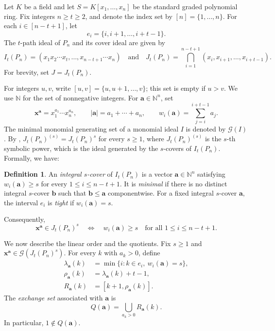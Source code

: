 \documentclass[12pt]{amsart}
\theoremstyle{definition}
\newtheorem{definition}[theorem]{Definition}
\theoremstyle{remark}
\numberwithin{equation}{section}
\begin{document}
Let $K$ be a field and let $S = K[x_1, \ldots, x_n]$ be the standard graded polynomial ring. Fix integers $n \ge t \ge 2$, and denote the index set by $[n] = \{1, \ldots, n\}$. For each $i \in [n-t+1]$, let
\[
e_i = \{i, i+1, \ldots, i+t-1\}.
\]
The $t$-path ideal of $P_n$ and its cover ideal are given by
$$I_t(P_n) = (x_1 x_2 \cdots x_t, \ldots, x_{n-t+1} \cdots x_n) \quad \text{and} \quad J_t(P_n) = \bigcap_{i=1}^{n-t+1} (x_i, x_{i+1}, \ldots, x_{i+t-1}).$$
For brevity, set $J=J_t(P_n)$.

For integers $u, v$, write $[u, v] = \{u, u+1, \ldots, v\}$; this set is empty if $u > v$. We use $\mathbb{N}$ for the set of nonnegative integers. For $\mathbf{a} \in \mathbb{N}^n$, set
\[
\mathbf{x}^{\mathbf{a}} = x_1^{a_1} \cdots x_n^{a_n}, 
\qquad |\mathbf{a}| = a_1 + \cdots + a_n, 
\qquad w_i(\mathbf{a}) = \sum_{j=i}^{i+t-1} a_j.
\]
The minimal monomial generating set of a monomial ideal $I$ is denoted by $\mathcal{G}(I)$. By \cite[Theorem 1.1]{HHT}, $J_t(P_n)^{(s)} = J_t(P_n)^s$ for every $s \ge 1$, where $J_t(P_n)^{(s)}$ is the $s$-th symbolic power, which is the ideal generated by the $s$-covers of $I_t(P_n)$. Formally, we have:

\begin{definition}
An \emph{integral $s$-cover} of $I_t(P_n)$ is a vector $\mathbf{a} \in \mathbb{N}^n$ satisfying $w_i(\mathbf{a}) \ge s$ for every $1 \le i \le n-t+1$. It is \emph{minimal} if there is no distinct integral $s$-cover $\mathbf{b}$ such that $\mathbf{b} \le \mathbf{a}$ componentwise. For a fixed integral $s$-cover $\mathbf{a}$, the interval $e_i$ is \emph{tight} if $w_i(\mathbf{a}) = s$.
\end{definition}

Consequently,
$$
\mathbf{x}^{\mathbf{a}} \in J_t(P_n)^s \quad \Longleftrightarrow \quad w_i(\mathbf{a}) \ge s \quad \text{for all } 1 \le i \le n-t+1.$$

We now describe the linear order and the quotients. 
Fix $s \ge 1$ and $\mathbf{x}^{\mathbf{a}} \in \mathcal{G}(J_t(P_n)^s)$.
For every $k$ with $a_k > 0$, define
\begin{align*}
\lambda_{\mathbf{a}}(k) &= \min\{i : k \in e_i, \ w_i(\mathbf{a}) = s\}, \\
\rho_{\mathbf{a}}(k) &= \lambda_{\mathbf{a}}(k) + t - 1, \\
R_{\mathbf{a}}(k) &= [k+1, \rho_{\mathbf{a}}(k)].
\end{align*}
The \emph{exchange set} associated with $\mathbf{a}$ is
$$
Q(\mathbf{a}) = \bigcup_{a_k > 0} R_{\mathbf{a}}(k).
$$
In particular, $1 \notin Q(\mathbf{a})$.
\end{document}
